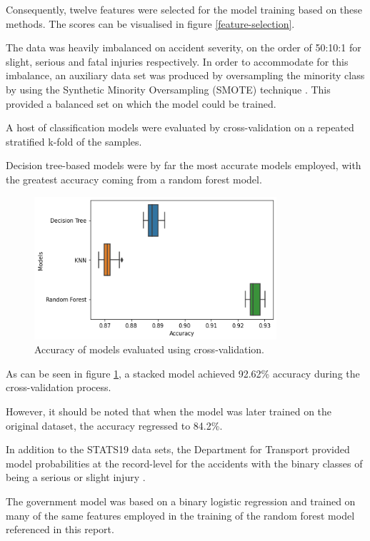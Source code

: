 \documentclass[12pt]{article}
\begin{document}
Consequently, twelve features were selected for the model training based on these methods. The scores can be visualised in figure \ref{feature-selection}.


The data was heavily imbalanced on accident severity, on the order of 50:10:1 for slight, serious and fatal injuries respectively. In order to accommodate for this imbalance, an auxiliary data set was produced by oversampling the minority class by using the Synthetic Minority Oversampling (SMOTE) technique \parencite{smote}. This provided a balanced set on which the model could be trained.


A host of classification models were evaluated by cross-validation on a repeated stratified k-fold of the samples.

Decision tree-based models were by far the most accurate models employed, with the greatest accuracy coming from a random forest model.

\begin{figure}[h]
\centering     %
\includegraphics[width=0.80\textwidth]{model_plot}
\caption{Accuracy of models evaluated using cross-validation.}
\label{models}
\end{figure}

As can be seen in figure \ref{models}, a stacked model achieved 92.62\% accuracy during the cross-validation process. 

However, it should be noted that when the model was later trained on the original dataset, the accuracy regressed to 84.2\%.

In addition to the STATS19 data sets, the Department for Transport provided model probabilities at the record-level for the accidents with the binary classes of being a serious or slight injury \parencite{model-report}.

The government model was based on a binary logistic regression and trained on many of the same features employed in the training of the random forest model referenced in this report.
\end{document}
